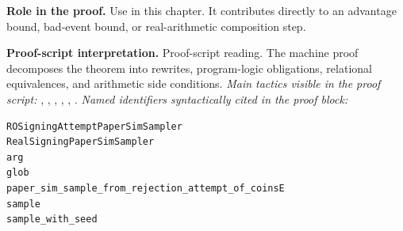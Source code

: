 \begin{formaltheorem}
\noindent\textbf{Role in the proof.}
Use in this chapter. It contributes directly to an advantage bound, bad-event bound, or real-arithmetic composition step.

\noindent\textbf{Proof-script interpretation.}
Proof-script reading. The machine proof decomposes the theorem into rewrites, program-logic obligations, relational equivalences, and arithmetic side conditions.
\emph{Main tactics visible in the proof script:} , , , , , .
\emph{Named identifiers syntactically cited in the proof block:}
\begin{lstlisting}[language=EasyCrypt,basicstyle=\ttfamily\scriptsize]
ROSigningAttemptPaperSimSampler
RealSigningPaperSimSampler
arg
glob
paper_sim_sample_from_rejection_attempt_of_coinsE
sample
sample_with_seed
\end{lstlisting}

\end{formaltheorem}

